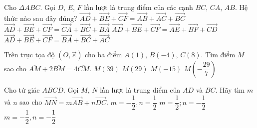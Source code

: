 \begin{ex}%
	Cho $\Delta ABC$. Gọi $D$, $E$, $F$ lần lượt là trung điểm của các cạnh $BC$, $CA$, $AB$. Hệ thức nào sau đây đúng?
	\choice
	{$\vec{AD}+\vec{BE}+\vec{CF}=\vec{AB}+\vec{AC}+\vec{BC}$}
	{$\vec{AD}+\vec{BE}+\vec{CF}=\vec{CA}+\vec{BC}+\vec{BA}$}
	{\True $\vec{AD}+\vec{BE}+\vec{CF}=\vec{AE}+\vec{BF}+\vec{CD}$}
	{$\vec{AD}+\vec{BE}+\vec{CF}=\vec{BA}+\vec{BC}+\vec{AC}$}
\end{ex}

\begin{ex}%
	Trên trục tọa độ $(O,\vec{e})$ cho ba điểm $A(1)$, $B(-4)$, $C(8)$. Tìm điểm $M$ sao cho $\overline{AM}+2\overline{BM}=4\overline{CM}$.
	\choice
	{\True $M(39)$}
	{$M(29)$}
	{$M(-15)$}
	{$M\left(-\dfrac{29}{7}\right)$}
\end{ex}

\begin{ex}%
	Cho tứ giác $ABCD$. Gọi $M$, $N$ lần lượt là trung điểm của $AD$ và $BC$. Hãy tìm $m$ và $n$ sao cho $\vec{MN}=m\vec{AB}+n\vec{DC}$.
	{$m=-\dfrac{1}{2},n=\dfrac{1}{2}$}
	{$m=\dfrac{1}{2};n=-\dfrac{1}{2}$}
	{$m=-\dfrac{1}{2},n=-\dfrac{1}{2}$}
\end{ex}


